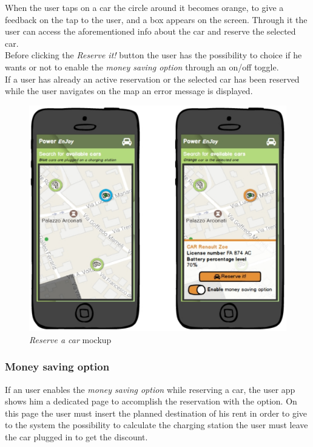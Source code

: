 When the user taps on a car the circle around it becomes orange, to give a feedback on the tap to the user, and a box appears on the screen. Through it the user can access the aforementioned info about the car and reserve the selected car. \\

Before clicking the \emph{Reserve it!} button the user has the possibility to choice if he wants or not to enable the \emph{money saving option} through an on/off toggle.\\

If a user has already an active reservation or the selected car has been reserved while the user navigates on the map an error message is displayed.\\

\begin{figure}[h]
			\centering
			\includegraphics[width=0.9\linewidth]{mockups/reserveCar}
			\caption{
				\label{fig:reserveCar} 
				\emph{Reserve a car} mockup
			}
		\end{figure}
		
\subsubsection{Money saving option}

If an user enables the \emph{money saving option} while reserving a car, the user app shows him a dedicated page to accomplish the reservation with the option. On this page the user must insert the planned destination of his rent in order to give to the system the possibility to calculate the charging station the user must leave the car plugged in to get the discount.\\

